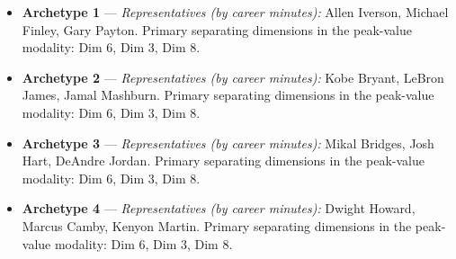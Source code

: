 \begin{itemize}
\item \textbf{Archetype 1} --- \emph{Representatives (by career minutes):} Allen Iverson, Michael Finley, Gary Payton. Primary separating dimensions in the peak-value modality: Dim 6, Dim 3, Dim 8.
\item \textbf{Archetype 2} --- \emph{Representatives (by career minutes):} Kobe Bryant, LeBron James, Jamal Mashburn. Primary separating dimensions in the peak-value modality: Dim 6, Dim 3, Dim 8.
\item \textbf{Archetype 3} --- \emph{Representatives (by career minutes):} Mikal Bridges, Josh Hart, DeAndre Jordan. Primary separating dimensions in the peak-value modality: Dim 6, Dim 3, Dim 8.
\item \textbf{Archetype 4} --- \emph{Representatives (by career minutes):} Dwight Howard, Marcus Camby, Kenyon Martin. Primary separating dimensions in the peak-value modality: Dim 6, Dim 3, Dim 8.
\end{itemize}
